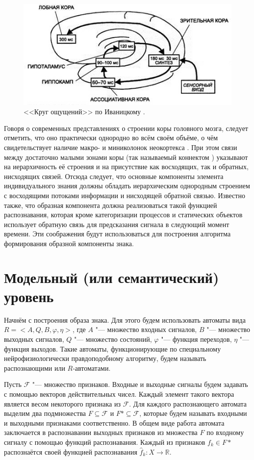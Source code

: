\documentclass[a4paper, 12pt]{article}
\theoremstyle{plain}
\begin{document}
	\begin{figure}[h]
		\centering
		\includegraphics[width=0.7\linewidth]{ivanitsky_cyrcle}
		\caption{<<Круг ощущений>> по Иваницкому \cite{Aleksandrov2007}.}
		\label{fig:ivan_cyrcle}
	\end{figure}
	
	Говоря о современных представлениях о строении коры головного мозга, следует отметить, что оно практически однородно во всём своём объёме, о чём свидетельствует наличие макро- и миниколонок неокортекса \cite{Mountcastle1998,Rockland2010}. При этом связи между достаточно малыми зонами коры (так называемый коннектом \cite{Zador2012}) указывают на иерархичность её строения и на присутствие как восходящих, так и обратных, нисходящих связей. Отсюда следует, что основные компоненты элемента индивидуального знания должны обладать иерархическим однородным строением с восходящими потоками информации и нисходящей обратной связью. Известно также, что образная компонента должна реализоваться такой функцией распознавания, которая кроме категоризации процессов и статических объектов использует обратную связь для предсказания сигнала в следующий момент времени. Эти соображения будут использоваться для построения алгоритма формирования образной компоненты знака.
	
	\section{Модельный (или семантический) уровень}\label{sect:seman}
	Начнём с построения образа знака. Для этого будем использовать автоматы вида  $R=<A,Q,B,\varphi, \eta>$, где $A$ "--- множество входных сигналов, $B$ "--- множество выходных сигналов, $Q$ "--- множество состояний, $\varphi$ "--- функция переходов, $\eta$ "--- функция выходов. Такие автоматы, функционирующие по специальному нейрофизиологически правдоподобному алгоритму, будем называть распознающими или $R$-автоматами. 
	
	Пусть $\mathcal F$ "--- множество признаков. Входные и выходные сигналы будем задавать с помощью  векторов действительных чисел. Каждый элемент такого вектора является весом некоторого признака из $\mathcal F$. Для каждого распознающего автомата выделим два подмножества $F\subseteq\mathcal F$ и $F*\subseteq\mathcal F$, которые будем называть входными и выходными признаками соответственно. В общем виде работа автомата заключается в распознавании выходных признаков из множества $F$ по входному сигналу с помощью функций распознавания. Каждый из признаков $f_k\in F*$ распознаётся своей функцией распознавания $\hat f_k: X\rightarrow \mathbb R$.
	
\end{document}
